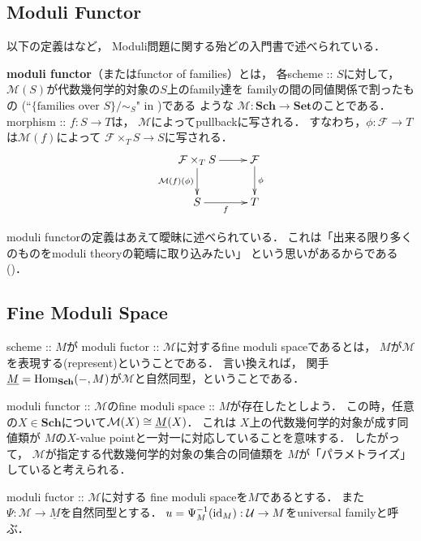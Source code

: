 \documentclass[a4paper]{jsarticle}
\newcommand{\Sch}{\mathbf{Sch}}
\newcommand{\Set}{\mathbf{Set}}
\newcommand{\famF}{\mathcal{F}}
\newcommand{\famU}{\mathcal{U}}
\newcommand{\ftor}[1]{\underline{#1}}
\newcommand{\ftorM}{\mathcal{M}}
\begin{document}
    \subsection{Moduli Functor}
    以下の定義は\cite{HaMo}など，
    Moduli問題に関する殆どの入門書で述べられている．
    \begin{Def}
        \textbf{moduli functor}（またはfunctor of families）とは，
        各scheme :: $S$に対して，
        $\ftorM(S)$が代数幾何学的対象の$S$上のfamily達を
        familyの間の同値関係で割ったもの
        (``$\{ \text{families over }S \}/\sim_S$" in \cite{Hos})である
        ような $\ftorM : \Sch \to \Set$のことである．
        morphism :: $f : S \to T$は，
        $\ftorM$によってpullbackに写される．
        すなわち，$\phi: \famF \to T$は$\ftorM(f)$によって
        $\famF \times_T S \to S$に写される．
        \[\xymatrix{
                \famF \times_T S \ar[d]_-{\ftorM(f)(\phi)}\ar[r]& \famF \ar[d]^-{\phi}\\
            S \ar[r]_-{f}& T
        }\]
    \end{Def}
    moduli functorの定義はあえて曖昧に述べられている．
    これは「出来る限り多くのものをmoduli theoryの範疇に取り込みたい」
    という思いがあるからである(\cite{HaMo})．

    \subsection{Fine Moduli Space}
    \begin{Def}
        scheme :: $M$が
        moduli fuctor :: $\ftorM$に対するfine moduli spaceであるとは，
        $M$が$\ftorM$を表現する(represent)ということである．
        言い換えれば，
        関手$\ftor{M}=\Hom_{\Sch}(-, M)$が$\ftorM$と自然同型，ということである．
    \end{Def}

    \begin{Remark}
        moduli functor :: $\ftorM$のfine moduli space :: $M$が存在したとしよう．
        この時，任意の$X \in \Sch$について$\ftorM(X) \iso \ftor{M}(X)$．
        これは
        $X$上の代数幾何学的対象が成す同値類が
        $M$の$X$-value pointと一対一に対応していることを意味する．
        したがって，
        $\ftorM$が指定する代数幾何学的対象の集合の同値類を
        $M$が「パラメトライズ」していると考えられる．
    \end{Remark}

    \begin{Def}
        moduli fuctor :: $\ftorM$に対する
        fine moduli spaceを$M$であるとする．
        また$\Psi: \ftorM \to \ftor{M}$を自然同型とする．
        $u=\Psi_M^{-1}(\id[M]): \famU \to M$をuniversal familyと呼ぶ．
    \end{Def}
\end{document}
